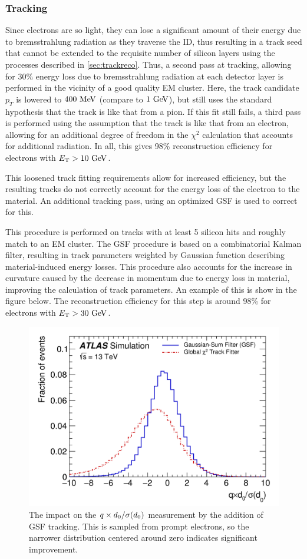 \subsubsection{Tracking}
Since electrons are so light, they can lose a significant amount of their energy due to bremsstrahlung radiation as they traverse the \ac{ID}, thus resulting in a track seed that cannot be extended to the requisite number of silicon layers using the processes described in \autoref{sec:trackreco}. Thus, a second pass at tracking, allowing for 30\% energy loss due to bremsstrahlung radiation at each detector layer is performed in the vicinity of a good quality \ac{EM} cluster. Here, the track candidate $p_{T}$ is lowered to $400 \MeV$ (compare to $1 \GeV$), but still uses the standard hypothesis that the track is like that from a pion. If this fit still fails, a third pass is performed using the assumption that the track is like that from an electron, allowing for an additional degree of freedom in the $\chi^2$ calculation that accounts for additional radiation. In all, this gives 98\% reconstruction efficiency for electrons with $\et > 10 \GeV$. 

This loosened track fitting requirements allow for increased efficiency, but the resulting tracks do not correctly account for the energy loss of the electron to the material. An additional tracking pass, using an optimized \ac{GSF} is used to correct for this. 

This procedure is performed on tracks with at least 5 silicon hits and roughly match to an \ac{EM} cluster. The \ac{GSF} procedure is based on a combinatorial Kalman filter, resulting in track parameters weighted by Gaussian function describing material-induced energy losses. This procedure also accounts for the increase in curvature caused by the decrease in momentum due to energy loss in material, improving the calculation of track parameters. An example of this is show in the figure below. The reconstruction efficiency for this step is around 98\% for electrons with $\et > 30 \GeV$. 

\begin{figure}[htbp]
\centering
\includegraphics[width=.7\textwidth]{figures/EventReconstruction/elec-qxd0.png}
\caption{The impact on the $q \times d_{0} /\sigma(d_{0})$ measurement by the addition of \ac{GSF} tracking. This is sampled from prompt electrons, so the narrower distribution centered around zero indicates significant improvement.}
\label{fig:elec_gsf}
\end{figure}


